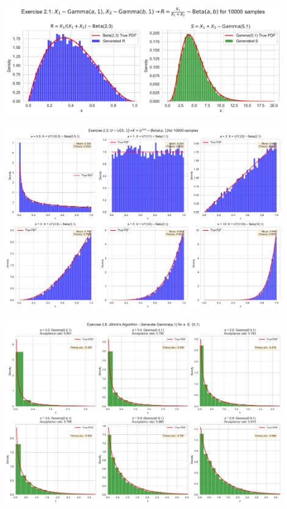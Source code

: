 \begin{center}
    \includegraphics[width=0.9\textwidth]{exercise2_1.pdf}
\end{center}
\begin{center}
    \includegraphics[width=0.9\textwidth]{exercise2_2.pdf}
\end{center}
\begin{center}
    \includegraphics[width=0.9\textwidth]{exercise2_5.pdf}
\end{center}